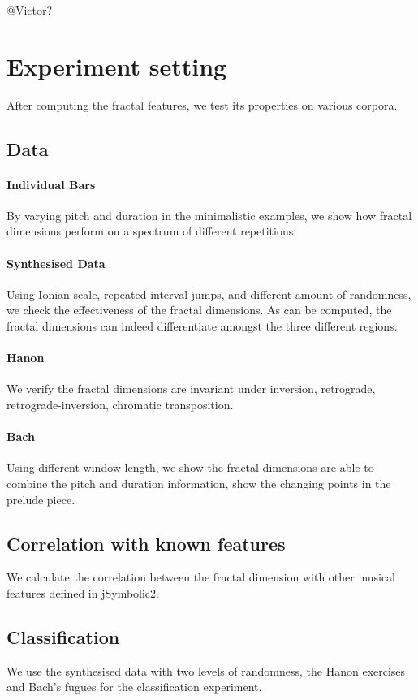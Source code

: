 \documentclass[acmsmall,review,anonymous]{acmart}\settopmatter{printfolios=true,printccs=false,printacmref=false}
\begin{document}
@Victor?

\section{Experiment setting}
After computing the fractal features, we test its properties on various corpora.
\subsection{Data}
\paragraph{Individual Bars}
By varying pitch and duration in the minimalistic examples, we show how fractal
dimensions perform on a spectrum of different repetitions.

\paragraph{Synthesised Data}
Using Ionian scale, repeated interval jumps, and different amount of randomness, we check the effectiveness of the fractal dimensions. As can be computed, the fractal dimensions can indeed differentiate amongst the three different regions.
\paragraph{Hanon}
We verify the fractal dimensions are invariant under inversion, retrograde,
retrograde-inversion, chromatic transposition.

\paragraph{Bach}
Using different window length, we show the fractal dimensions are able to
combine the pitch and duration information, show the changing points in the
prelude piece.

\subsection{Correlation with known features}
We calculate the correlation between the fractal dimension with other musical
features defined in jSymbolic2. 

\subsection{Classification}
We use the synthesised data with two levels of randomness, the Hanon exercises
and Bach's fugues for the classification experiment.
\end{document}
